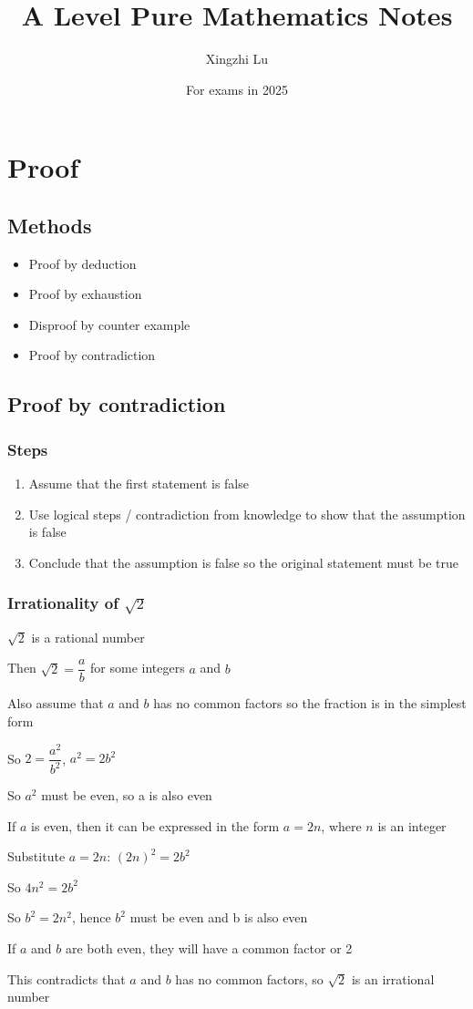\documentclass[A4paper]{article}
\title{A Level Pure Mathematics Notes}
\author{Xingzhi Lu}
\date{For exams in 2025}
\begin{document}
	\maketitle
	
	\section{Proof}
	\subsection{Methods}
	\begin{itemize}
		\item Proof by deduction
		\item Proof by exhaustion
		\item Disproof by counter example
		\item Proof by contradiction
	\end{itemize}
	\subsection{Proof by contradiction}
	\subsubsection{Steps}
	\begin{enumerate}
		\item Assume that the first statement is false
		\item Use logical steps / contradiction from knowledge to show that the assumption is false
		\item Conclude that the assumption is false so the original statement must be true
	\end{enumerate}
	\subsubsection{Irrationality of $\sqrt{2}$}
	\begin{description}
		\item [Assumption:] $\sqrt{2}$ is a rational number
		\item Then $\sqrt{2} = \dfrac{a}{b}$ for some integers $a$ and $b$
		\item Also assume that $a$ and $b$ has no common factors so the fraction is in the simplest form
		\item So $2=\dfrac{a^2}{b^2}$, $a^2=2b^2$
		\item So $a^2$ must be even, so a is also even
		\item If $a$ is even, then it can be expressed in the form $a=2n$, where $n$ is an integer
		\item Substitute $a=2n$: $(2n)^2=2b^2$
		\item So $4n^2 = 2b^2$
		\item So $b^2=2n^2$, hence $b^2$ must be even and b is also even
		\item If $a$ and $b$ are both even, they will have a common factor or 2
		\item This contradicts that $a$ and $b$ has no common factors, so $\sqrt{2}$ is an irrational number
	\end{description}
\end{document}
